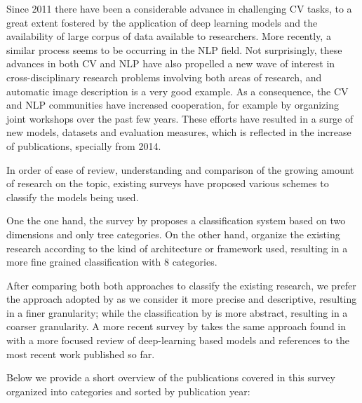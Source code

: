 Since 2011 there have been a considerable advance in challenging CV tasks, to a great extent fostered by the application of deep learning models and the availability of large corpus of data available to researchers. More recently, a similar process seems to be occurring in the NLP field. Not surprisingly, these advances in both CV and NLP have also propelled a new wave of interest in cross-disciplinary research problems involving both areas of research, and automatic image description is a very good example. As a consequence, the CV and NLP communities have increased cooperation, for example by organizing joint workshops over the past few years. These efforts have resulted in a surge of new models, datasets and evaluation measures, which is reflected in the increase of publications, specially from 2014. 

In order of ease of review, understanding and comparison of the growing amount of research on the topic, existing surveys have proposed various schemes to classify the models being used.

One the one hand, the survey by \citet{Bernardi2017} proposes a classification system based on two dimensions and only tree categories. On the other hand, \citet{Bai2018} organize the existing research according to the kind of architecture or framework used, resulting in a more fine grained classification with 8 categories. 

After comparing both both approaches to classify the existing research, we  prefer the approach adopted by \citet{Bai2018} as we consider it more precise and descriptive,  resulting in a finer granularity; while the classification by \cite{Bernardi2017} is more abstract, resulting in a coarser granularity. A more recent survey by \citet{Hossain2019} takes the same approach found in \citep{Bai2018} with a more focused review of deep-learning based models and references to the most recent work published so far.

Below we provide a short overview of the publications covered in this survey organized into categories and sorted by publication year:

